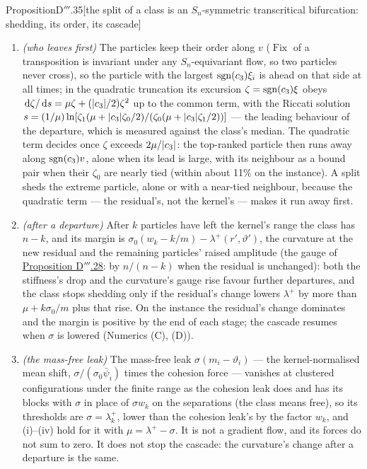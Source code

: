 \begin{thm}{Proposition}{D$'''$.35}[the split of a class is an $S_n$-symmetric transcritical bifurcation: shedding, its
order, its cascade]
\begin{enumerate}[label=\textup{(\roman*)}]
    $S_{n/2}\times S_{n/2}$ states, which are cubic (at $\abs{\xi}\sim\sqrt{\abs{\mu}}$, on one side of the threshold
    only). Past the threshold ($\mu > 0$) the class leaves a fixed neighbourhood of the replicated state from almost
    every initial condition: the split is a jump, not a gradual separation.
  \item \emph{(who leaves first)} The particles keep their order along $v$ ($\operatorname{Fix}$ of a transposition
    is invariant under any $S_n$-equivariant flow, so two particles never cross), so the particle with the largest
    $\operatorname{sgn}(c_3)\xi_i$ is ahead on that side at all times; in the quadratic truncation its excursion
    $\zeta = \operatorname{sgn}(c_3)\xi$ obeys $\,\mathrm{d}\zeta/\,\mathrm{d} s = \mu\zeta + (\lvert c_3\rvert/2)\zeta^2$ up to the common term, with the
    Riccati solution
    $s = (1/\mu)\ln[\zeta_1(\mu + \lvert c_3\rvert\zeta_0/2)/(\zeta_0(\mu + \lvert c_3\rvert\zeta_1/2))]$ --- the leading behaviour
    of the departure, which is measured against the class's median. The quadratic term decides once $\zeta$ exceeds
    $2\mu/\lvert c_3\rvert$: the top-ranked particle then runs away along $\operatorname{sgn}(c_3)v$, alone when its lead is large, with
    its neighbour as a bound pair when their $\zeta_0$ are nearly tied (within about 11\% on the instance). A split
    sheds the extreme particle, alone or with a near-tied neighbour, because the quadratic term --- the residual's, not
    the kernel's --- makes it run away first.
  \item \emph{(after a departure)} After $k$ particles have left the kernel's range the class has $n - k$, and its
    margin is $\sigma_0(w_k - k/m) - \lambda^+(r',\vartheta')$, the curvature at the new residual and the remaining
    particles' raised amplitude (the gauge of \hyperref[res:thmDppp:28]{Proposition D$'''$.28}: by $n/(n - k)$ when the
    residual is unchanged): both the stiffness's drop and the curvature's gauge rise favour further departures, and
    the class stops shedding only if the residual's change lowers $\lambda^+$ by more than $\mu + k\sigma_0/m$ plus
    that rise. On the instance the residual's change dominates and the margin is positive by the end of each stage;
    the cascade resumes when $\sigma$ is lowered (Numerics (C), (D)).
  \item \emph{(the mass-free leak)} The mass-free leak $\sigma(m_i - \vartheta_i)$ --- the kernel-normalised mean
    shift, $\sigma/(\sigma_0\bar\psi_i)$ times the cohesion force --- vanishes at clustered configurations under the
    finite range as the cohesion leak does and has its blocks with $\sigma$ in place of $\sigma w_k$ on the
    separations (the class means free), so its thresholds are $\sigma = \lambda^+_k$, lower than the cohesion leak's
    by the factor $w_k$, and (i)--(iv) hold for it with $\mu = \lambda^+ - \sigma$. It is not a gradient flow, and its
    forces do not sum to zero. It does not stop the cascade: the curvature's change after a departure is the same.
\end{enumerate}
\end{thm}

